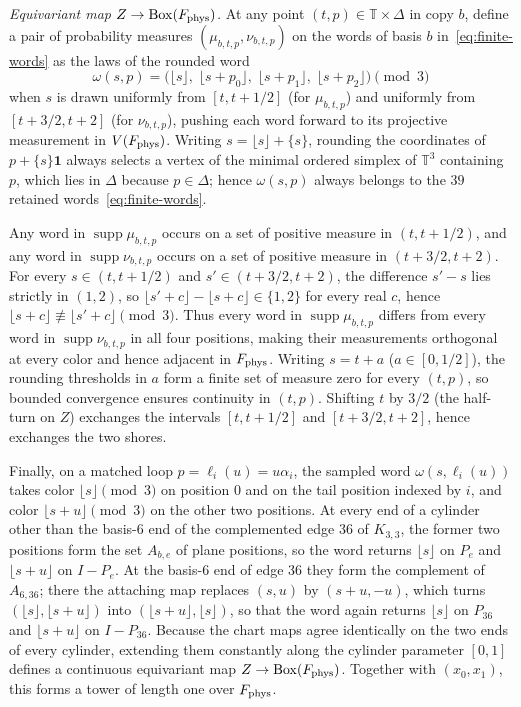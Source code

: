 \emph{Equivariant map $Z\to\operatorname{Box}(F_{\rm phys})$.} At any point $(t,p)\in\mathbb T\times\Delta$ in copy $b$, define a pair of probability measures $(\mu_{b,t,p},\nu_{b,t,p})$ on the words of basis $b$ in~\eqref{eq:finite-words} as the laws of the rounded word
\[
 \omega(s,p)=\bigl(\lfloor s\rfloor,\;\lfloor s+p_0\rfloor,\;\lfloor s+p_1\rfloor,\;\lfloor s+p_2\rfloor\bigr)\pmod3
\]
when $s$ is drawn uniformly from $[t,t+1/2]$ (for $\mu_{b,t,p}$) and uniformly from $[t+3/2,t+2]$ (for $\nu_{b,t,p}$), pushing each word forward to its projective measurement in $V(F_{\rm phys})$. Writing $s=\lfloor s\rfloor+\{s\}$, rounding the coordinates of $p+\{s\}\mathbf 1$ always selects a vertex of the minimal ordered simplex of $\mathbb T^3$ containing $p$, which lies in $\Delta$ because $p\in\Delta$; hence $\omega(s,p)$ always belongs to the $39$ retained words~\eqref{eq:finite-words}.

Any word in $\operatorname{supp}\mu_{b,t,p}$ occurs on a set of positive measure in $(t,t+1/2)$, and any word in $\operatorname{supp}\nu_{b,t,p}$ occurs on a set of positive measure in $(t+3/2,t+2)$. For every $s\in(t,t+1/2)$ and $s'\in(t+3/2,t+2)$, the difference $s'-s$ lies strictly in $(1,2)$, so $\lfloor s'+c\rfloor-\lfloor s+c\rfloor\in\{1,2\}$ for every real $c$, hence $\lfloor s+c\rfloor\not\equiv\lfloor s'+c\rfloor\pmod3$. Thus every word in $\operatorname{supp}\mu_{b,t,p}$ differs from every word in $\operatorname{supp}\nu_{b,t,p}$ in all four positions, making their measurements orthogonal at every color and hence adjacent in $F_{\rm phys}$. Writing $s=t+a$ ($a\in[0,1/2]$), the rounding thresholds in $a$ form a finite set of measure zero for every $(t,p)$, so bounded convergence ensures continuity in $(t,p)$. Shifting $t$ by $3/2$ (the half-turn on $Z$) exchanges the intervals $[t,t+1/2]$ and $[t+3/2,t+2]$, hence exchanges the two shores.

Finally, on a matched loop $p=\ell_i(u)=u\alpha_i$, the sampled word $\omega(s,\ell_i(u))$ takes color $\lfloor s\rfloor\pmod3$ on position $0$ and on the tail position indexed by $i$, and color $\lfloor s+u\rfloor\pmod3$ on the other two positions. At every end of a cylinder other than the basis-$6$ end of the complemented edge $36$ of $K_{3,3}$, the former two positions form the set $A_{b,e}$ of plane positions, so the word returns $\lfloor s\rfloor$ on $P_e$ and $\lfloor s+u\rfloor$ on $I-P_e$. At the basis-$6$ end of edge $36$ they form the complement of $A_{6,36}$; there the attaching map replaces $(s,u)$ by $(s+u,-u)$, which turns $(\lfloor s\rfloor,\lfloor s+u\rfloor)$ into $(\lfloor s+u\rfloor,\lfloor s\rfloor)$, so that the word again returns $\lfloor s\rfloor$ on $P_{36}$ and $\lfloor s+u\rfloor$ on $I-P_{36}$. Because the chart maps agree identically on the two ends of every cylinder, extending them constantly along the cylinder parameter $[0,1]$ defines a continuous equivariant map $Z\to\operatorname{Box}(F_{\rm phys})$. Together with $(x_0,x_1)$, this forms a tower of length one over $F_{\rm phys}$.
